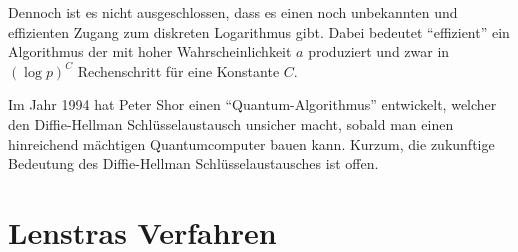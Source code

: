 Dennoch ist es nicht ausgeschlossen,
dass es einen noch unbekannten und
effizienten Zugang zum diskreten Logarithmus gibt. Dabei bedeutet
``effizient'' ein Algorithmus der mit hoher Wahrscheinlichkeit $a$
produziert und zwar in $(\log p)^C$ Rechenschritt für eine Konstante
$C$.

Im Jahr 1994 hat Peter Shor einen ``Quantum-Algorithmus'' entwickelt,
welcher den Diffie-Hellman Schlüsselaustausch unsicher macht, sobald
man einen hinreichend mächtigen Quantumcomputer bauen kann.
Kurzum, die zukunftige Bedeutung des Diffie-Hellman
Schlüsselaustausches ist offen.  


\section{Lenstras Verfahren}



